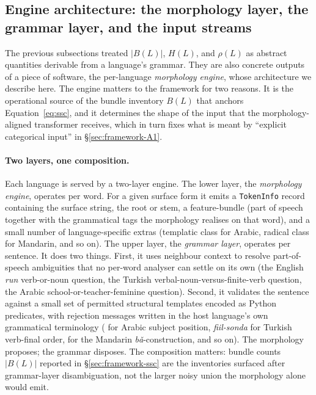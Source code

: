 \subsection{Engine architecture: the morphology layer, the grammar layer, and the input streams}
\label{sec:framework-engine}

The previous subsections treated $|B(L)|$, $H(L)$, and $\rho(L)$ as abstract quantities derivable from a language's grammar. They are also concrete outputs of a piece of software, the per-language \emph{morphology engine}, whose architecture we describe here. The engine matters to the framework for two reasons. It is the operational source of the bundle inventory $B(L)$ that anchors Equation~\ref{eq:ssc}, and it determines the shape of the input that the morphology-aligned transformer receives, which in turn fixes what is meant by ``explicit categorical input'' in \S\ref{sec:framework-A1}.

\paragraph{Two layers, one composition.}
Each language is served by a two-layer engine. The lower layer, the \emph{morphology engine}, operates per word. For a given surface form it emits a \texttt{TokenInfo} record containing the surface string, the root or stem, a feature-bundle (part of speech together with the grammatical tags the morphology realises on that word), and a small number of language-specific extras (templatic class for Arabic, radical class for Mandarin, and so on). The upper layer, the \emph{grammar layer}, operates per sentence. It does two things. First, it uses neighbour context to resolve part-of-speech ambiguities that no per-word analyser can settle on its own (the English \emph{run} verb-or-noun question, the Turkish verbal-noun-versus-finite-verb question, the Arabic  school-or-teacher-feminine question). Second, it validates the sentence against a small set of permitted structural templates encoded as Python predicates, with rejection messages written in the host language's own grammatical terminology ( for Arabic subject position, \emph{fiil-sonda} for Turkish verb-final order,  for the Mandarin \emph{b\v{a}}-construction, and so on). The morphology proposes; the grammar disposes. The composition matters: bundle counts $|B(L)|$ reported in \S\ref{sec:framework-ssc} are the inventories surfaced after grammar-layer disambiguation, not the larger noisy union the morphology alone would emit.

